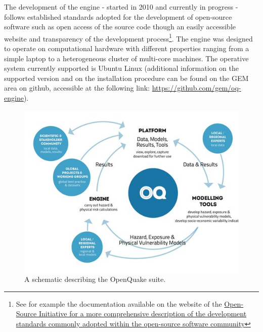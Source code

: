 The development of the engine - started in 2010 and currently in progress -
follows established standards adopted for the development of open-source
software such as open access of the source code though an easily accessible
website and transparency of the development process\footnote{See for example the
    documentation available on the website of the
    \href{http://opensource.org/osr}{Open-Source Initiative for a 
more comprehensive description of the development standards commonly 
adopted within the open-source software community}}.
The engine was designed to operate on computational hardware with different properties
ranging from a simple laptop to a heterogeneous cluster of multi-core machines.
The operative system currently supported is Ubuntu Linux (additional
information on the supported version and on the installation procedure can 
be found on the GEM area on github, accessible at the following link:
\href{https://github.com/gem/oq-engine}{https://github.com/gem/oq-engine}). 
\begin{figure}[!ht]
\centering
\includegraphics[width=14cm]{./Pictures/intro/OQ-workflows.jpg}
\caption{A schematic describing the OpenQuake suite.}
\label{fig:oq_platform}
\end{figure}
%
